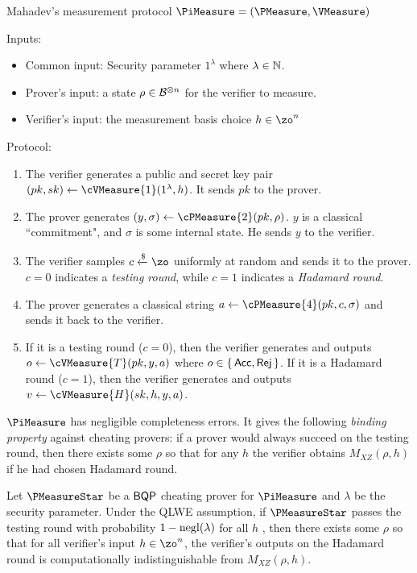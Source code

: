\begin{protocol}{Mahadev's measurement protocol $\PiMeasure=(\PMeasure, \VMeasure)$}
	\label{proto:urmila4}

	Inputs:
	\begin{itemize}
		\item Common input: Security parameter $1^\lambda$ where $\lambda\in\mathbb{N}$.
		\item Prover's input: a state $\rho\in\mathcal{B}^{\otimes n}$ for the verifier to measure.
		\item Verifier's input: the measurement basis choice $h \in \zo^n$
	\end{itemize}

	Protocol:
	\begin{enumerate}
		\item \label{step:measure1} The verifier generates a public and secret key pair $(pk, sk)\leftarrow\cVMeasure{1}(1^\lambda, h)$. It sends $pk$ to the prover.
		\item \label{step:measure2} The prover generates $(y, \sigma)\leftarrow\cPMeasure{2}(pk, \rho)$.
			$y$ is a classical ``commitment", and $\sigma$ is some internal state.
			He sends $y$ to the verifier.
		\item \label{step:measure3} The verifier samples $c\xleftarrow{\$}\zo$ uniformly at random and sends it to the prover. $c=0$ indicates a \emph{testing round}, while $c=1$ indicates a \emph{Hadamard round}.
		\item \label{step:measure4} The prover generates a classical string $a\leftarrow\cPMeasure{4}(pk, c, \sigma)$ and sends it back to the verifier.
		\item \label{step:output} If it is a testing round ($c=0$), then the verifier generates and outputs $o\leftarrow\cVMeasure{T}(pk, y, a)$ where $o\in\set{\mathsf{Acc}, \mathsf{Rej}}$.
			If it is a Hadamard round ($c=1$), then the verifier generates and outputs $v\leftarrow\cVMeasure{H}(sk, h, y, a)$.
	\end{enumerate}
\end{protocol}

$\PiMeasure$ has negligible completeness errors.
It gives the following \emph{binding property} against cheating provers:
if a prover would always succeed on the testing round, then there exists some $\rho$ so that for any $h$ the verifier obtains $M_{XZ}(\rho, h)$ if he had chosen Hadamard round.

\begin{lemma}
	\label{lem:urmila-binding}
	Let $\PMeasureStar$ be a $\operatorname{\mathsf{BQP}}$ cheating  prover for $\PiMeasure$ and $\lambda$ be the security parameter. Under the QLWE assumption, if $\PMeasureStar$ passes the testing round with probability $1-\operatorname{negl}(\lambda)$ for all $h$ , then there exists some $\rho$ so that for all verifier's input $h \in \zo^n$, the verifier's outputs on the Hadamard round is computationally indistinguishable from $M_{XZ}(\rho, h)$.
\end{lemma}

